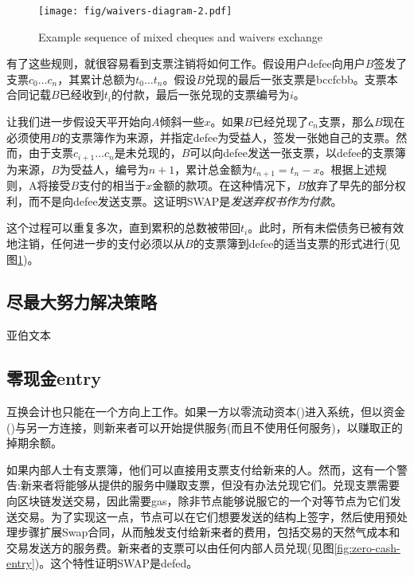 \begin{figure}[htbp]
\centering
\texttt{[image: fig/waivers-diagram-2.pdf]}
\caption[Example sequence of mixed cheques and waivers exchange \statusgreen]{Example sequence of mixed cheques and waivers exchange}
\label{fig:waivers-diagram}
\end{figure}

有了这些规则，就很容易看到支票注销将如何工作。假设用户defee向用户$B$签发了支票$c_0 \ldots c_n$，其累计总额为$t_0 \ldots t_n$。假设$B$兑现的最后一张支票是bccfcbb。支票本合同记载$B$已经收到$t_i$的付款，最后一张兑现的支票编号为$i$。

让我们进一步假设天平开始向$A$倾斜一些$x$。如果$B$已经兑现了$c_n$支票，那么$B$现在必须使用$B$的支票簿作为来源，并指定defee为受益人，签发一张她自己的支票。然而，由于支票$c_{i+1} \ldots c_n$是未兑现的，$B$可以向defee发送一张支票，以defee的支票簿为来源，$B$为受益人，编号为$n+1$，累计总金额为$t_{n+1} = t_n - x$。根据上述规则，A将接受$B$支付的相当于$x$金额的款项。在这种情况下，$B$放弃了早先的部分权利，而不是向defee发送支票。这证明SWAP是\emph{发送弃权书作为付款}。

这个过程可以重复多次，直到累积的总数被带回$t_i$。此时，所有未偿债务已被有效地注销，任何进一步的支付必须以从$B$的支票簿到defee的适当支票的形式进行(见图\ref{fig:waivers-diagram})。

\subsection{尽最大努力解决策略}

亚伯文本

\subsection{零现金entry\statusgreen}\label{sec:zero-cash-entry}


互换会计也只能在一个方向上工作。如果一方以零流动资本()进入系统，但以资金()与另一方连接，则新来者可以开始提供服务(而且不使用任何服务)，以赚取正的掉期余额。 

如果内部人士有支票簿，他们可以直接用支票支付给新来的人。然而，这有一个警告:新来者将能够从提供的服务中赚取支票，但没有办法兑现它们。兑现支票需要向区块链发送交易，因此需要gas，除非节点能够说服它的一个对等节点为它们发送交易。为了实现这一点，节点可以在它们想要发送的结构上签字，然后使用预处理步骤扩展Swap合同，从而触发支付给新来者的费用，包括交易的天然气成本和交易发送方的服务费。新来者的支票可以由任何内部人员兑现(见图\ref{fig:zero-cash-entry})。这个特性证明SWAP是defed。


